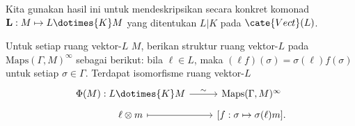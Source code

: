 Kita gunakan hasil ini untuk mendeskripsikan secara konkret komonad
$\mathbf{L}:M\mapsto L\dotimes{K}M$ yang ditentukan $L|K$ pada
$\cate{Vect}(L)$.

\begin{lemma}\label{prop:Galois-descent-comonad-0}
	Untuk setiap ruang vektor-$L$ $M$, berikan struktur ruang vektor-$L$ pada
	$\mathrm{Maps}(\Gamma,M)^\infty$ sebagai berikut: bila $\ell\in L$, maka
	$(\ell f)(\sigma)=\sigma(\ell)f(\sigma)$ untuk setiap $\sigma\in\Gamma$.
	Terdapat isomorfisme ruang vektor-$L$
	\begin{equation}\label{eqn:comonad-smMap}
		\begin{tikzcd}[row sep=tiny]
			\Phi(M): L \dotimes{K} M \arrow[r, "\sim"] & \mathrm{Maps}(\Gamma, M)^\infty \\
			\ell \otimes m \arrow[mapsto, r] & {\left[ f: \sigma \mapsto \sigma(\ell)m \right]}.
		\end{tikzcd}
	\end{equation}
\end{lemma}

